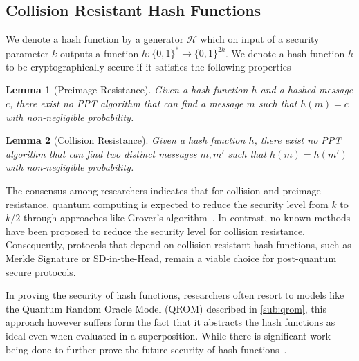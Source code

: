 \documentclass[11pt]{report}
\theoremstyle{definition}
\theoremstyle{plain}
\newtheorem{lemma}{Lemma}[section]
\begin{document}
\subsection{Collision Resistant Hash Functions}\label{sec:prelim_hash}
We denote a hash function by a generator $\mathcal{H}$ which on input of a security parameter $k$ outputs a function $h : \{0,1{\}}^* \rightarrow \{0,1{\}}^{2k}$. We denote a hash function $h$ to be cryptographically secure if it satisfies the following properties

\begin{lemma}[Preimage Resistance]\label{lem:preimage}
  Given a hash function $h$ and a hashed message $c$, there exist no PPT algorithm that can find a message $m$ such that $h(m) = c$ with non-negligible probability.
\end{lemma}

\begin{lemma}[Collision Resistance]\label{lem:collision}
  Given a hash function $h$, there exist no PPT algorithm that can find two distinct messages $m, m'$ such that $h(m) = h(m')$ with non-negligible probability.
\end{lemma}

The consensus among researchers indicates that for collision and preimage resistance, quantum computing is expected to reduce the security level from $k$ to $k/2$ through approaches like Grover's algorithm~\cite{nielsen2010quantumgrover}. In contrast, no known methods have been proposed to reduce the security level for collision resistance. Consequently, protocols that depend on collision-resistant hash functions, such as Merkle Signature or SD-in-the-Head, remain a viable choice for post-quantum secure protocols.

In proving the security of hash functions, researchers often resort to models like the Quantum Random Oracle Model (QROM) described in \autoref{sub:qrom}, this approach however suffers form the fact that it abstracts the hash functions as ideal even when evaluated in a superposition. While there is significant work being done to further prove the future security of hash functions~\cite{dtuPostquantumSecurity}.
\end{document}
